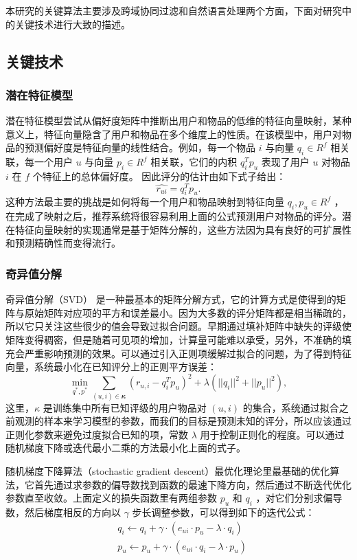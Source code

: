 本研究的关键算法主要涉及跨域协同过滤和自然语言处理两个方面，下面对研究中的关键技术进行大致的描述。

\subsection{关键技术} %
\label{sub:关键技术}
\subsubsection{潜在特征模型}
潜在特征模型尝试从偏好度矩阵中推断出用户和物品的低维的特征向量映射，某种意义上，特征向量隐含了用户和物品在多个维度上的性质。在该模型中，用户对物品的预测偏好度是特征向量的线性结合。例如，每一个物品 $i$ 与向量 $q_i \in R^f$ 相关联，每一个用户 $u$ 与向量 $p_i \in R^f$ 相关联，它们的内积 $q_i^Tp_u$ 表现了用户 $u$ 对物品 $i$ 在 $f$ 个特征上的总体偏好度。 因此评分的估计由如下式子给出：
$$
\hat{r_{ui}} = q_i^Tp_u.
$$
这种方法最主要的挑战是如何将每一个用户和物品映射到特征向量 $q_i, p_u \in R^f$ ，在完成了映射之后，推荐系统将很容易利用上面的公式预测用户对物品的评分。潜在特征向量映射的实现通常是基于矩阵分解的，这些方法因为具有良好的可扩展性和预测精确性而变得流行。

\subsubsection{奇异值分解}
奇异值分解（SVD）\cite{paterek2007improving} 是一种最基本的矩阵分解方式，它的计算方式是使得到的矩阵与原始矩阵对应项的平方和误差最小。因为大多数的评分矩阵都是相当稀疏的，所以它只关注这些很少的值会导致过拟合问题。早期通过填补矩阵中缺失的评级使矩阵变得稠密，但是随着可见项的增加，计算量可能难以承受，另外，不准确的填充会严重影响预测的效果。可以通过引入正则项缓解过拟合的问题，为了得到特征向量，系统最小化在已知评分上的正则平方误差：
\begin{equation}
\min_{q^*, p^*} {\sum\limits_{(u,i) \in 𝜿} {{(r_{u,i}-q_i^Tp_u)}^2 + \lambda(||q_i||^2 + ||p_u||^2)} } ,
\end{equation}
这里，$\kappa$ 是训练集中所有已知评级的用户物品对 $(u,i)$ 的集合，系统通过拟合之前观测的样本来学习模型的参数，而我们的目标是预测未知的评分，所以应该通过正则化参数来避免过度拟合已知的项，常数 $\lambda$ 用于控制正则化的程度。可以通过随机梯度下降或迭代最小二乘的方法最小化上面的式子。

随机梯度下降算法（stochastic gradient descent）最优化理论里最基础的优化算法，它首先通过求参数的偏导数找到函数的最速下降方向，然后通过不断迭代优化参数直至收敛。上面定义的损失函数里有两组参数 $p_{u}$ 和 $q_{i}$ ，对它们分别求偏导数，然后梯度相反的方向以  $𝛾$ 步长调整参数，可以得到如下的迭代公式：
\begin{equation}
\begin{aligned}
&q_i \leftarrow q_i + 𝛾 \cdot(e_{ui} \cdot p_u -\lambda \cdot q_i)\\
&p_u \leftarrow p_u + 𝛾 \cdot(e_{ui} \cdot q_i- \lambda \cdot p_u)
\end{aligned}
\end{equation}

